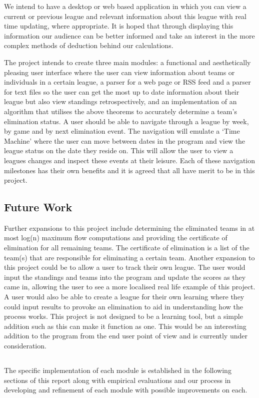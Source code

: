 \documentclass{report}
\begin{document}
We intend to have a desktop or web based application in which you can view a current or previous league and relevant information about this league with real time updating, where appropriate. It is hoped that through displaying this information our audience can be better informed and take an interest in the more complex methods of deduction behind our calculations.

The project intends to create three main modules: a functional and aesthetically pleasing user interface where the user can view information about teams or individuals in a certain league, a parser for a web page or RSS feed and a parser for text files so the user can get the most up to date information about their league but also view standings retrospectively, and an implementation of an algorithm that utilises the above theorems to accurately determine a team's elimination status. A user should be able to navigate through a league by week, by game and by next elimination event. The navigation will emulate a `Time Machine' where the user can move between dates in the program and view the league status on the date they reside on. This will allow the user to view a leagues changes and inspect these events at their leisure. Each of these navigation milestones has their own benefits and it is agreed that all have merit to be in this project.

\subsection*{Future Work}

Further expansions to this project include determining the eliminated teams in at most log(n) maximum flow computations and providing the certificate of elimination for all remaining teams. The certificate of elimination is a list of the team(s) that are responsible for eliminating a certain team.
Another expansion to this project could be to allow a user to track their own league. The user would input the standings and teams into the program and update the scores as they came in, allowing the user to see a more localised real life example of this project. A user would also be able to create a league for their own learning where they could input results to provoke an elimination to aid in understanding how the process works. This project is not designed to be a learning tool, but a simple addition such as this can make it function as one. This would be an interesting addition to the program from the end user point of view and is currently under consideration. 

\subsection*{}

The specific implementation of each module is established in the following sections of this report along with empirical evaluations and our process in developing and refinement of each module with possible improvements on each.


{}
\end{document}
